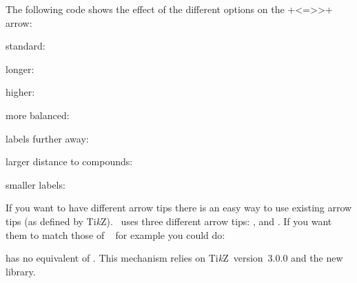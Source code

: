 \documentclass[load-preamble+]{cnltx-doc}
\newcommand*\TikZ{Ti\textit{k}Z}
\begin{document}
The following code shows the effect of the different options on the \verbcode+<=>>+
arrow:
\begin{example}
  standard:  \par
  longer:  \par
  higher:  \par
  more balanced:  \par
  labels further away:  \par
  larger distance to compounds:  \par
  smaller labels: 
\end{example}

If you want to have different arrow tips there is an easy
way to use existing arrow tips (as defined by \TikZ).  \chemformula\ uses
three different arrow tips: ,  and .  If
you want them to match those of ~\cite{pkg:chemfig} for example
you could do:
\begin{sourcecode}
\end{sourcecode}
 has no equivalent of .  This mechanism relies on
\TikZ\ version~3.0.0 and the new  library.
\end{document}
